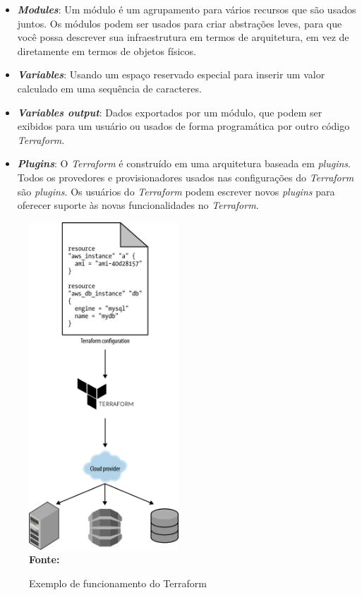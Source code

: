\begin{itemize}
\item \textbf{\textit{Modules}}: Um módulo é um agrupamento para vários recursos que são usados juntos. Os módulos podem ser usados para criar abstrações leves, para que você possa descrever sua infraestrutura em termos de arquitetura, em vez de diretamente em termos de objetos físicos.

\item \textbf{\textit{Variables}}: Usando um espaço reservado especial para inserir um valor calculado em uma sequência de caracteres. 

 \item \textbf{\textit{Variables output}}: Dados exportados por um módulo, que podem ser exibidos para um usuário  ou usados de forma programática por outro código \textit{Terraform}.
 
 \item \textbf{\textit{Plugins}}: O \textit{Terraform} é construído em uma arquitetura baseada em \textit{plugins}. Todos os provedores e provisionadores usados nas configurações do \textit{Terraform} são \textit{plugins}. Os usuários do \textit{Terraform} podem escrever novos \textit{plugins} para oferecer suporte às novas funcionalidades no \textit{Terraform}.
 \end{itemize}
  
  \begin{figure}[H]
	\centering	
	\caption[\hspace{0.1cm}Exemplo de funcionamento do Terraform]{Exemplo de funcionamento do Terraform}
	\vspace{-0.4cm}
	\includegraphics[width=0.5\textwidth]{figuras/terraform-working.png}
	 \vspace{-0.2cm}
	\\\textbf{\footnotesize Fonte: \cite{oreilly}}
	\label{fig:figura7}
\end{figure}
\vspace{-0.5cm}



